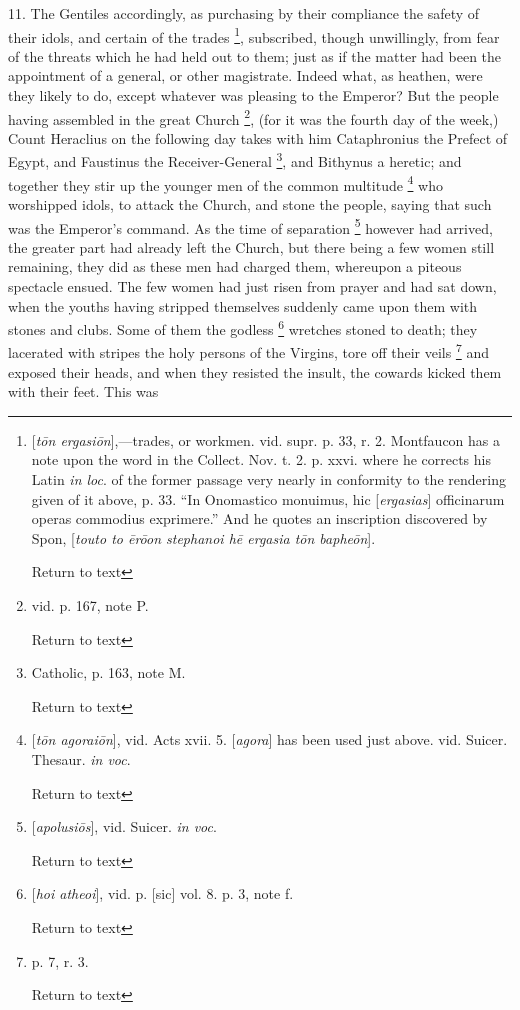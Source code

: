 11. The Gentiles accordingly, as purchasing by
their compliance the safety of their idols, and certain of the trades
\footnote{[\emph{t\={o}n ergasi\={o}n}],—trades,
or workmen. vid. supr. p. 33, r. 2. Montfaucon has a note upon the
word in the Collect. Nov. t. 2. p. xxvi. where he corrects his Latin \emph{in
loc}. of the former passage very nearly in conformity to the
rendering given of it above, p. 33. ``In Onomastico monuimus, hic [\emph{ergasias}]
officinarum operas commodius exprimere.'' And he quotes an
inscription discovered by Spon, [\emph{touto to \={e}r\={o}on
stephanoi h\={e} ergasia t\={o}n baphe\={o}n}].

Return to text}, subscribed, though unwillingly, from fear of the threats
which he had held out to them; just as if the matter had been the
appointment of a general, or other magistrate. Indeed what, as
heathen, were they likely to do, except whatever was pleasing to the
Emperor? But the people having assembled in the great Church \footnote{vid. p. 167, note P.

Return to text}, (for it was the fourth day of the week,) Count Heraclius on the
following day takes with him Cataphronius the Prefect of Egypt, and
Faustinus the Receiver-General \footnote{Catholic, p. 163, note M.

Return to text}, and Bithynus a heretic; and
together they stir up the younger men of the common multitude \footnote{[\emph{t\={o}n agorai\={o}n}], vid. Acts
xvii. 5. [\emph{agora}] has been used just above. vid. Suicer. Thesaur.
\emph{in voc}.

Return to text}
who worshipped idols, to attack the Church, and stone the people,
saying that such was the Emperor's command. As the time of
separation \footnote{[\emph{apolusi\={o}s}], vid. Suicer. \emph{in
voc}.

Return to text} however had arrived, the greater part had already
left the Church, but there being a few women still remaining, they did
as these men had charged them, whereupon a piteous spectacle ensued.
The few women had just risen from prayer and had sat down, when the
youths having stripped themselves suddenly came upon them with stones
and clubs. Some of them the godless \footnote{[\emph{hoi atheoi}], vid. p. [sic] vol. 8. p. 3,
note f.

Return to text} wretches stoned to
death; they lacerated with stripes the holy persons of the Virgins,
tore off their veils \footnote{p. 7, r. 3.

Return to text} and exposed their heads, and when they
resisted the insult, the cowards kicked them with their feet. This was
